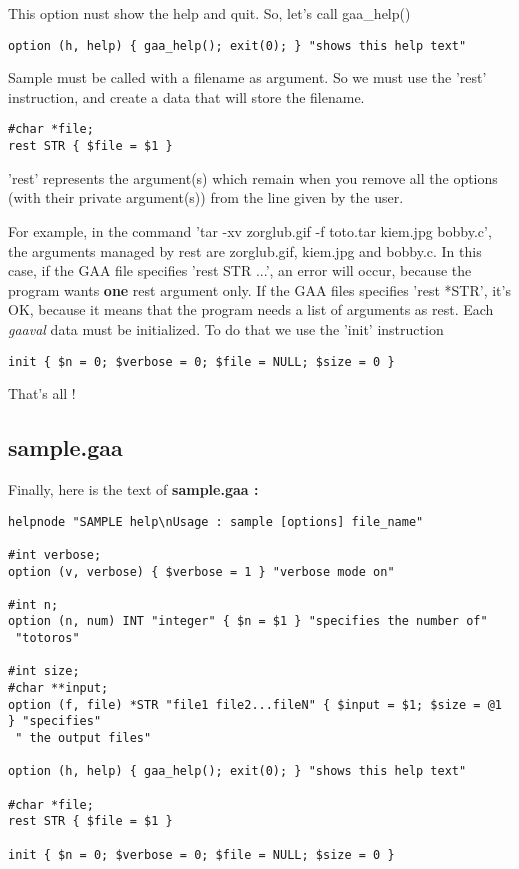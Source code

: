 This option nust show the help and quit. So, let's
call gaa\_help()

\begin{verbatim}
option (h, help) { gaa_help(); exit(0); } "shows this help text"
\end{verbatim}
Sample must be called with a filename as argument. So
we must use the 'rest' instruction, and create a data that will store the
filename.

\begin{verbatim}
#char *file;
rest STR { $file = $1 }
\end{verbatim}

'rest' represents the argument(s) which remain when
you remove all the options (with their private argument(s)) from the line
given by the user.

\par For example, in the command 'tar -xv zorglub.gif -f toto.tar kiem.jpg bobby.c', 
the arguments managed by rest are zorglub.gif,
kiem.jpg and bobby.c. In this case, if the GAA file specifies 'rest STR
{...}', an error will occur, because the program wants {\bf one} rest
argument only. If the GAA files specifies 'rest *STR', it's OK, because
it means that the program needs a list of arguments as rest.
Each {\it gaaval} data must be initialized. To
do that we use the 'init' instruction

\begin{verbatim}
init { $n = 0; $verbose = 0; $file = NULL; $size = 0 }
\end{verbatim}

\par That's all !

\subsection{sample.gaa}
Finally, here is the text of {\bf sample.gaa :}

\begin{verbatim}
helpnode "SAMPLE help\nUsage : sample [options] file_name"

#int verbose;
option (v, verbose) { $verbose = 1 } "verbose mode on"

#int n;
option (n, num) INT "integer" { $n = $1 } "specifies the number of" 
 "totoros"

#int size;
#char **input;
option (f, file) *STR "file1 file2...fileN" { $input = $1; $size = @1 } "specifies"
 " the output files"

option (h, help) { gaa_help(); exit(0); } "shows this help text"

#char *file;
rest STR { $file = $1 }

init { $n = 0; $verbose = 0; $file = NULL; $size = 0 }
\end{verbatim}

